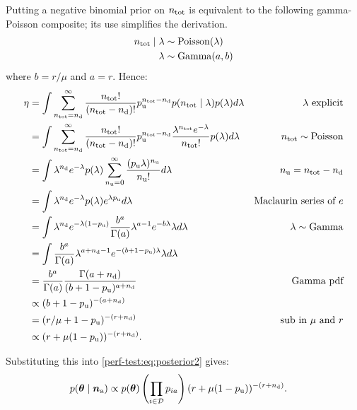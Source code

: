 \documentclass[thesis.tex]{subfiles}
\begin{document}
Putting a negative binomial prior on $n_\text{tot}$ is equivalent to the following gamma-Poisson composite; its use simplifies the derivation.
\begin{align}
n_\text{tot} \mid \lambda &\sim \operatorname{Poisson}(\lambda) \\
\lambda &\sim \operatorname{Gamma}(a, b)
\end{align}
where $b = r / \mu$ and $a = r$.
Hence:
\begin{align}
\eta
&= \int \sum_{n_\text{tot}=n_\text{d}}^\infty \frac{n_\text{tot}!}{(n_\text{tot}-n_\text{d})!} p_\text{u}^{n_\text{tot}-n_\text{d}} p(n_\text{tot} \mid \lambda) p(\lambda) d\lambda &\text{$\lambda$ explicit}\\
&= \int \sum_{n_\text{tot}=n_\text{d}}^\infty \frac{n_\text{tot}!}{(n_\text{tot}-n_\text{d})!} p_\text{u}^{n_\text{tot}-n_\text{d}} \frac{\lambda^{n_\text{tot}} e^{-\lambda}}{n_\text{tot}!} p(\lambda) d\lambda &n_\text{tot} \sim \operatorname{Poisson}\\
&= \int \lambda^{n_\text{d}} e^{-\lambda} p(\lambda) \sum_{n_\text{u}=0}^\infty \frac{(p_\text{u} \lambda)^{n_\text{u}}}{n_\text{u}!} d\lambda &n_\text{u} = n_\text{tot}-n_\text{d}\\
&= \int \lambda^{n_\text{d}} e^{-\lambda} p(\lambda) e^{\lambda p_\text{u}} d\lambda &\text{Maclaurin series of $e$} \\
&= \int \lambda^{n_\text{d}} e^{-\lambda(1 - p_\text{u})} \frac{b^a}{\Gamma(a)} \lambda^{a-1} e^{-b\lambda} \lambda d\lambda &\lambda \sim \operatorname{Gamma}\\
&= \int \frac{b^a}{\Gamma(a)} \lambda^{a+n_\text{d}-1} e^{-(b+1-p_\text{u})\lambda} \lambda d\lambda \\
&= \frac{b^a}{\Gamma(a)} \frac{\Gamma(a+n_\text{d})}{(b+1-p_\text{u})^{a+n_\text{d}}} &\text{Gamma pdf}\\
&\propto (b+1-p_\text{u})^{-(a+n_\text{d})} \\
&= (r/\mu + 1 - p_\text{u})^{-(r+n_\text{d})} &\text{sub in $\mu$ and $r$}\\
&\propto(r + \mu (1- p_\text{u}))^{-(r+n_\text{d})}.
\end{align}

Substituting this into \cref{perf-test:eq:posterior2} gives:
\begin{align}
p(\bm{\theta} \mid \bm{n}_\text{a})
&\propto p(\bm{\theta}) \left( \prod_{i \in \mathcal{D}} p_{ia} \right) (r + \mu (1- p_\text{u}))^{-(r+n_\text{d})} \label{perf-test:eq:full-posterior}.
\end{align}
\end{document}
